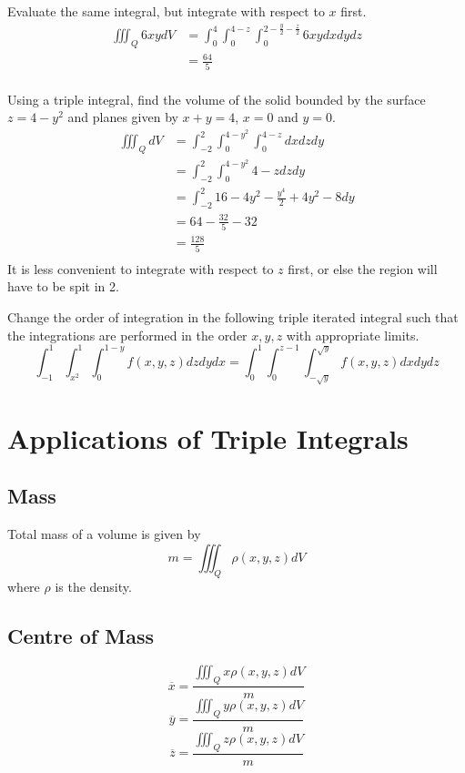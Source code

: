 \documentclass[12pt]{article}
\begin{document}
\begin{ex}
	Evaluate the same integral, but integrate with respect to $x$ first.
	\begin{align*}
		\iiint_Q 6xydV &= \int_0^4 \int_0^{4-z} \int_0^{2-\frac{y}{2} - \frac{z}{2}} 6xy dxdydz \\
			       &= \frac{64}{5} \\
	\end{align*}
\end{ex}

\begin{ex}
	Using a triple integral, find the volume of the solid bounded by the surface $z = 4-y^2$ and planes given by $x + y = 4$, $x = 0$ and $y = 0$.
	\begin{align*}
		\iiint_Q dV &= \int_{-2}^2 \int_0^{4-y^2} \int_0^{4-z} dxdzdy \\
			    &= \int_{-2}^2 \int_0^{4-y^2} 4-z dzdy \\
			    &= \int_{-2}^2 16 - 4y^2 - \frac{y^4}{2} + 4y^2 - 8 dy \\
			    &= 64 - \frac{32}{5} - 32 \\
			    &= \frac{128}{5} \\
	\end{align*}
	It is less convenient to integrate with respect to $z$ first, or else the region will have to be spit in 2.
\end{ex}

\begin{ex}
	Change the order of integration in the following triple iterated integral such that the integrations are performed in the order $x, y, z$ with appropriate limits.
	$$\int_{-1}^1 \int_{x^2}^1 \int_0^{1-y} f(x,y,z) dzdydx = \int_0^1 \int_0^{z-1} \int_{-\sqrt{y}}^{\sqrt{y}} f(x,y,z) dxdydz$$
\end{ex}

\section{Applications of Triple Integrals}

\subsection{Mass}
Total mass of a volume is given by
$$m = \iiint_Q \rho(x,y,z) dV$$
where $\rho$ is the density.

\subsection{Centre of Mass}
$$\overline{x} = \frac{\iiint_Q x\rho(x,y,z)dV}{m}$$
$$\overline{y} = \frac{\iiint_Q y\rho(x,y,z)dV}{m}$$
$$\overline{z} = \frac{\iiint_Q z\rho(x,y,z)dV}{m}$$
\end{document}
